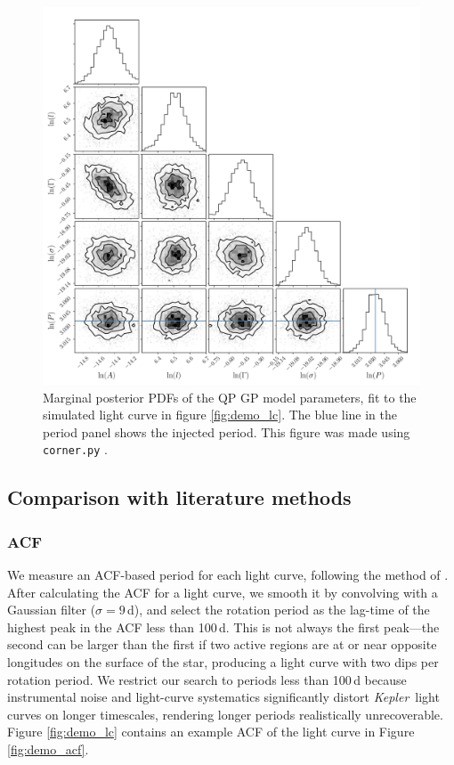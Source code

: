 \documentclass[useAMS, usenatbib, preprint, 12pt]{aastex}
\newcommand{\Kepler}{{\it Kepler}}
\newcommand{\kepler}{\Kepler}
\begin{document}
\begin{figure}
\begin{center}
\includegraphics[width=6in, clip=true]{figures/corner_plot.pdf}
\caption{Marginal posterior PDFs of the QP GP model parameters, fit to the
    simulated light curve in figure \ref{fig:demo_lc}.
    The blue line in the period panel shows the injected period.
    This figure was made using \texttt{corner.py} \citep{Corner}.}
\label{fig:gp_posteriors}
\end{center}
\end{figure}


\subsection{Comparison with literature methods}
\label{sec:comparison}
\subsubsection{ACF}
\label{sec:acf}

We measure an ACF-based period for each light curve,
following the method of
\citet{Mcquillan2013}.
After calculating the ACF for a light curve, we smooth it by convolving with a
Gaussian filter ($\sigma=9$\,d), and select the rotation period as the
lag-time of the highest peak in the ACF less than 100\,d.
This is not always the first peak---the second can be larger than the first if
two active regions are at or near opposite longitudes on the surface of
the star, producing a light curve with two dips per rotation period.
We restrict our search to periods less than 100\,d because instrumental
noise and light-curve systematics significantly distort \kepler\ light
curves on longer timescales, rendering longer periods realistically unrecoverable.
Figure \ref{fig:demo_lc} contains an example ACF of the light curve in
Figure \ref{fig:demo_acf}.
\end{document}
